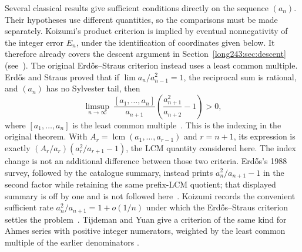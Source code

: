 \documentclass[11pt]{article}
\begin{document}
Several classical results give sufficient conditions directly on the
sequence $(a_n)$. Their hypotheses use different quantities, so the
comparisons must be made separately. Koizumi's product criterion is
implied by eventual nonnegativity of the integer error $E_n$, under the
identification of coordinates given below. It therefore already covers
the descent argument in Section~\ref{long243:sec:descent}
(see~\cite[Cor.~4(1) and Prop.~1(1), pp.~14--15]{koizumi2025}).
The original Erd\H{o}s--Straus criterion instead uses a least common multiple.
Erd\H{o}s and Straus proved that if $\lim a_n/a_{n-1}^{2}=1$, the reciprocal
sum is rational, and $(a_n)$ has no Sylvester tail, then
\[
 \limsup_{n\to\infty}\ \frac{[a_1,\ldots,a_n]}{a_{n+1}}
 \left(\frac{a_{n+1}^{2}}{a_{n+2}}-1\right)>0,
\]
where $[a_1,\ldots,a_n]$ is the least common
multiple~\cite[Theorem~3, p.~132]{erdosstraus1964}.  This is the indexing in
the original theorem. With $A_r=\operatorname{lcm}(a_1,\ldots,a_{r-1})$
and $r=n+1$, its expression is exactly
$(A_r/a_r)(a_r^2/a_{r+1}-1)$, the LCM quantity considered here.
The index change is not an additional difference between those two
criteria. Erd\H{o}s's 1988 survey, followed by the
catalogue summary, instead prints $a_n^2/a_{n+1}-1$ in the second factor while
retaining the same prefix-LCM quotient; that displayed summary is off by one
and is not followed here~\cite[p.~105]{erdos1988}\cite{erdosproblems}.
Koizumi records the convenient sufficient rate
$a_n^2/a_{n+1}=1+o(1/n)$ under which the Erd\H{o}s--Straus criterion settles
the problem~\cite[Remark~3, p.~16]{koizumi2025}.  Tijdeman and Yuan give a
criterion of the same kind for Ahmes series with positive integer numerators,
weighted by the least common multiple of the earlier denominators
\cite{tijdemanyuan2002}.
\end{document}
